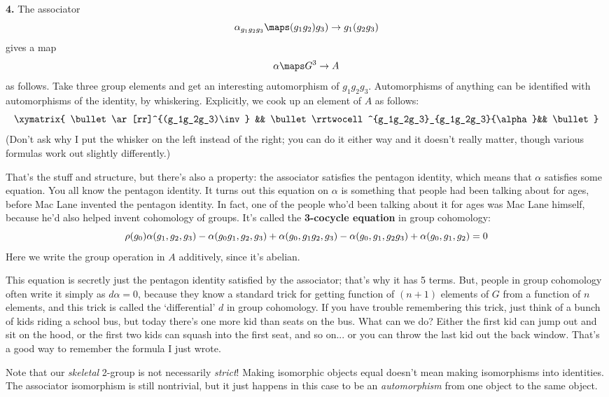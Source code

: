\documentclass{amsart}
\begin{document}
{\bf 4.} The associator
  \[ \alpha_{g_1g_2g_3}\maps (g_1g_2)g_3) \to g_1(g_2g_3) \]
  gives a map
  \[ \alpha\maps G^3\to A \]
  as follows.  Take three group elements and get an interesting
  automorphism of $g_1g_2g_3$.  Automorphisms of anything can be
  identified with automorphisms of the identity, by whiskering.
  Explicitly, we cook up an element of $A$ as follows:
  \[\xymatrix{
   \bullet \ar[rr]^{(g_1g_2g_3)\inv} && \bullet 
   \rrtwocell^{g_1g_2g_3}_{g_1g_2g_3}{\alpha}&& \bullet
  }\]
  (Don't ask why I put the whisker on the left instead of the
  right; you can do it either way and it doesn't really matter,
  though various formulas work out slightly differently.)

That's the stuff and structure, but there's also a property: the
  associator satisfies the pentagon identity, which means that
  $\alpha$ satisfies some equation.  You all know the pentagon
  identity.  It turns out this equation on $\alpha$ is something
  that people had been talking about for ages, before Mac Lane
  invented the pentagon identity.  In fact, one of the people who'd been
  talking about it for ages was Mac Lane himself, because he'd also
  helped invent cohomology of groups.  It's called the 
  \textbf{3-cocycle equation}
  in group cohomology:  
   \[
  \rho(g_0)\alpha(g_1,g_2,g_3) - \alpha(g_0g_1, g_2, g_3) +  
  \alpha(g_0, g_1g_2, g_3) \\ - \alpha(g_0, g_1, g_2g_3) +
  \alpha(g_0, g_1, g_2) = 0
  \]
  Here we write the group operation in $A$ additively, since it's abelian.

  This equation is secretly just the pentagon identity satisfied by the
  associator; that's why it has 5 terms.  But, people in group cohomology
  often write it simply as $d\alpha=0$, because they know a standard
  trick for getting function of $(n+1)$ elements of $G$ from a function 
  of $n$ elements, and this trick is called the `differential' $d$ in 
  group cohomology.  If you have trouble remembering this trick, just 
  think of a bunch of kids riding a school bus, but today there's one
  more kid than seats on the bus.  What can we do?  Either the first kid
  can jump out and sit on the hood, or the first two kids can squash 
  into the first seat, and so on... or you can throw the last kid out 
  the back window.  That's a good way to remember the formula I just wrote.

Note that our \emph{skeletal} 2-group is not necessarily
\emph{strict}!  Making isomorphic objects equal doesn't mean making
isomorphisms into identities.  The associator isomorphism is still
nontrivial, but it just happens in this case to be an
\emph{automorphism} from one object to the same object.
\end{document}
